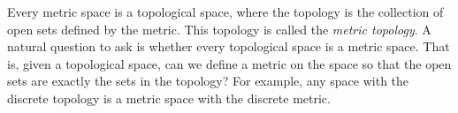 \begin{comment}

\ActivitySolution

\ba
\item 
	\begin{enumerate}[i.]
	\item Since there is no set in $\mathcal{B}$ that contains the element $b$, the set $\mathcal{B}$ is not a basis for the topology $\tau$. Since every set in $\mathcal{B}$ must be an open set, and every set in $\tau$ has to be a union of sets in $\mathcal{B}$, we need add the open sets $\{c,d\}$ and $\{b,c,d,e,f\}$ to $\mathcal{B}$ to make a basis for the topology.
	
	\item Since
\begin{align*}
\{a\} &= \{a\} \\
\{c,d\} &= \{c,d\} \\
\{a,c,d\} &= \{a\} \cup \{c,d\} \\
\{b,c,d,e,f\} &= \{b,c,d,e,f\}
X &=  \{a\} \cup\{b,c,d,e,f\},
\end{align*}
we conclude that $\mathcal{B}$ is a basis for $\tau$

	\end{enumerate}
	
\item The set $\mathcal{B}$ is not a basis for $\tau$ because $\{b\}$ is not a union of sets in $\mathcal{B}$. If we add $\{b\}$ to $\mathcal{B}$, then we have all of the single point sets. Every subset of $X$ can be made of a union of single point sets, which then produces a basis for $\tau$. 

\item Since every single point set is open, our basis has to include all single point sets. But every subset of $X$ can be made of a union of single point sets, which explains why the collection of single points sets is a basis for $\tau$. 

\ea

\end{comment}


Every metric space is a topological space, where the topology is the collection of open sets defined by the metric. This topology is called the \emph{metric topology}. A natural question to ask is whether every topological space is a metric space. That is, given a topological space, can we define a metric on the space so that the open sets are exactly the sets in the topology? For example, any space with the discrete topology is a metric space with the discrete metric. 

